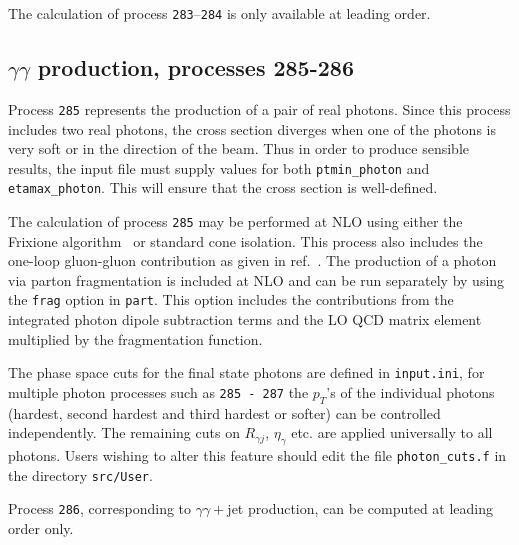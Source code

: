 The calculation of process {\tt 283}--{\tt 284} is only available at leading order.

\subsection{$\gamma\gamma$ production, processes 285-286}
\label{subsec:gamgam}

Process {\tt 285} represents the production of a pair of real photons.
Since this process includes two real photons, the cross section diverges
when one of the photons is very soft or in the direction of the beam.
Thus in order to produce sensible results, the input file must supply values for both
{\tt ptmin\_photon} and {\tt etamax\_photon}. This will ensure that
the cross section is well-defined.

The calculation of process {\tt 285} may be performed at NLO using either the
Frixione algorithm~\cite{Frixione:1998jh} or standard cone isolation.  This process also includes
the one-loop gluon-gluon contribution as given in
ref.~\cite{Bern:2002jx}.  The production of a photon via parton fragmentation is included at NLO and 
can be run separately by using the {\tt frag} option in {\tt part}. This option includes the contributions from the 
integrated 
photon dipole subtraction terms and the LO QCD matrix element multiplied by the fragmentation function.  


The phase space cuts for the final state photons are defined in {\tt{input.ini}}, for multiple photon processes such 
as {\tt 285 - 287} the $p_T$'s of the individual photons (hardest, second hardest and third hardest or softer) can be 
controlled independently. 
The remaining cuts on $R_{\gamma j}$, $\eta_{\gamma}$ etc. are applied universally to all photons. Users wishing to 
alter
this feature should edit the file {\tt{photon\_cuts.f}} in the directory {\tt{src/User}}. 


Process {\tt 286}, corresponding to $\gamma\gamma+$jet production, can be computed at leading order only.

